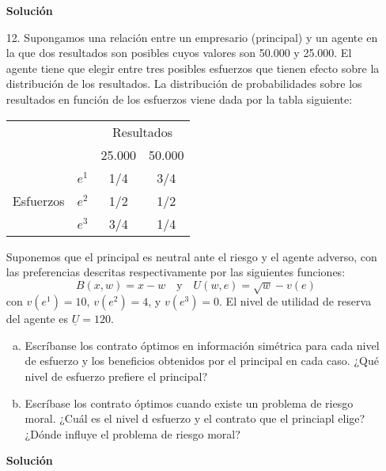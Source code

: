 \documentclass[10pt,a4paper]{article}
\begin{document}
\begin{enumerate}
					\textbf{\large Solución}\\
						
		\item [12.] Supongamos una relación entre un empresario (principal) y un agente en la que dos resultados son posibles cuyos valores son 50.000 y 25.000. El agente tiene que elegir entre tres posibles esfuerzos que tienen efecto sobre la distribución de los resultados. La distribución de probabilidades sobre los resultados en función de los esfuerzos viene dada por la tabla siguiente:
				\begin{center}
					\begingroup
						\setlength{\tabcolsep}{10pt} %
						\renewcommand{\arraystretch}{1.5} %
							\begin{tabular}{cc|cc}
									&& \multicolumn{2}{c}{Resultados}\\
											&& 25.000 & 50.000\\
								\hline
									\multirow{3}{*}{Esfuerzos} & $e^1$ & 1/4 & 3/4\\
															   & $e^2$ & 1/2 & 1/2\\
															   & $e^3$ & 3/4 & 1/4
							\end{tabular}
						\endgroup
				\end{center}
			Suponemos que el principal es neutral ante el riesgo y el agente adverso, con las preferencias descritas respectivamente por las siguientes funciones:
			$$B(x,w)=x-w \quad \text{y} \quad U(w,e)=\sqrt{w}-v(e)$$
			con $v\left(e^{1}\right)=10$, $v\left(e^{2}\right)=4$, y $v\left(e^{3}\right)=0$. El nivel de utilidad de reserva del agente es $\underline{U}=120$.
				\begin{enumerate}[a)]
					\item Escríbanse los contrato óptimos en información simétrica para cada nivel de esfuerzo y los beneficios obtenidos por el principal en cada caso. ¿Qué nivel de esfuerzo prefiere el principal?
					\item Escríbase los contrato óptimos cuando existe un problema de riesgo moral. ¿Cuál es el nivel d esfuerzo y el contrato que el princiapl elige? ¿Dónde influye el problema de riesgo moral?
				\end{enumerate}
					\textbf{\large Solución}\\
						
	\end{enumerate}
\end{document}
